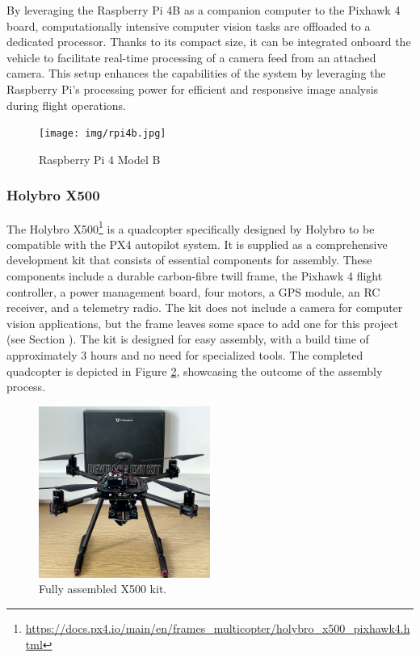 By leveraging the Raspberry Pi 4B as a companion computer to the Pixhawk 4 board, computationally intensive computer vision tasks are offloaded to a dedicated processor. Thanks to its compact size, it can be integrated onboard the vehicle to facilitate real-time processing of a camera feed from an attached camera. This setup enhances the capabilities of the system by leveraging the Raspberry Pi's processing power for efficient and responsive image analysis during flight operations.

\begin{figure}[H]
  \centering
  \texttt{[image: img/rpi4b.jpg]}
  \caption{Raspberry Pi 4 Model B}
  \label{fig:rpi4b}
\end{figure}


\subsubsection{Holybro X500}
\label{subsec:x500}

The Holybro X500\footnote{\url{https://docs.px4.io/main/en/frames_multicopter/holybro_x500_pixhawk4.html}} is a quadcopter specifically designed by Holybro to be compatible with the PX4 autopilot system. It is supplied as a comprehensive development kit that consists of essential components for assembly. These components include a durable carbon-fibre twill frame, the Pixhawk 4 flight controller, a power management board, four motors, a GPS module, an RC receiver, and a telemetry radio. The kit does not include a camera for computer vision applications, but the frame leaves some space to add one for this project (see Section \label{subsec:onboard}). The kit is designed for easy assembly, with a build time of approximately 3 hours and no need for specialized tools. The completed quadcopter is depicted in Figure \ref{fig:x500}, showcasing the outcome of the assembly process.

\begin{figure}[H]
  \centering
  \includegraphics[width=0.5\textwidth,keepaspectratio]{img/X500-assembled.jpg}
  \caption{Fully assembled X500 kit.}
  \label{fig:x500}
\end{figure}

